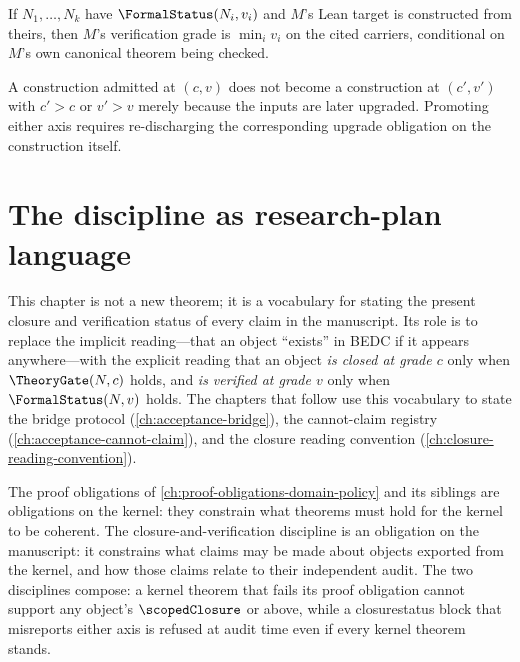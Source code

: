 \begin{theorem}
\label{thm:verification-status-reuse}
If $N_1, \dotsc, N_k$ have $\FormalStatus(N_i, v_i)$ and $M$'s Lean target is constructed from theirs, then $M$'s verification grade is $\min_i v_i$ on the cited carriers, conditional on $M$'s own canonical theorem being checked.
\end{theorem}

\begin{remark}
\label{rem:no-retroactive-promotion}
A construction admitted at $(c, v)$ does not become a construction at $(c', v')$ with $c' > c$ or $v' > v$ merely because the inputs are later upgraded. Promoting either axis requires re-discharging the corresponding upgrade obligation on the construction itself.
\end{remark}

\section{The discipline as research-plan language}
\label{sec:closure-as-language}

\begin{remark}
\label{rem:closure-discipline-purpose}
This chapter is not a new theorem; it is a vocabulary for stating the present closure and verification status of every claim in the manuscript. Its role is to replace the implicit reading---that an object ``exists'' in BEDC if it appears anywhere---with the explicit reading that an object \emph{is closed at grade $c$} only when $\TheoryGate(N, c)$ holds, and \emph{is verified at grade $v$} only when $\FormalStatus(N, v)$ holds. The chapters that follow use this vocabulary to state the bridge protocol (\autoref{ch:acceptance-bridge}), the cannot-claim registry (\autoref{ch:acceptance-cannot-claim}), and the closure reading convention (\autoref{ch:closure-reading-convention}).
\end{remark}

\begin{remark}
\label{rem:closure-discipline-not-kernel-obligation}
The proof obligations of \autoref{ch:proof-obligations-domain-policy} and its siblings are obligations on the kernel: they constrain what theorems must hold for the kernel to be coherent. The closure-and-verification discipline is an obligation on the manuscript: it constrains what claims may be made about objects exported from the kernel, and how those claims relate to their independent audit. The two disciplines compose: a kernel theorem that fails its proof obligation cannot support any object's $\scopedClosure$ or above, while a closurestatus block that misreports either axis is refused at audit time even if every kernel theorem stands.
\end{remark}

